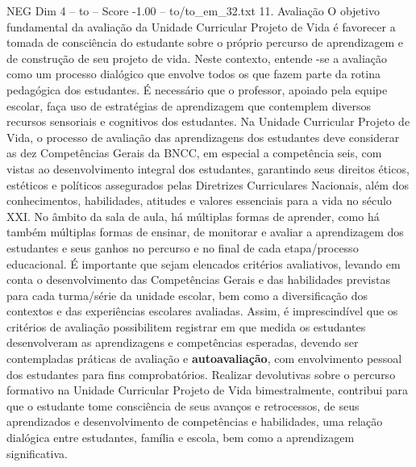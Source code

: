 \begin{textsample}{NEG Dim 4 – to – Score -1.00 – to/to\_em\_32.txt}  \label{ex:f4_neg_090}
11.
Avaliação O objetivo fundamental da avaliação da Unidade Curricular Projeto de Vida é favorecer a tomada de consciência do estudante sobre o próprio percurso de aprendizagem e de construção de seu projeto de vida.
Neste contexto, entende -se a avaliação como um processo dialógico que envolve todos os que fazem parte da rotina pedagógica dos estudantes.
É necessário que o professor, apoiado pela equipe escolar, faça uso de estratégias de aprendizagem que contemplem diversos recursos sensoriais e cognitivos dos estudantes.
Na Unidade Curricular Projeto de Vida, o processo de avaliação das aprendizagens dos estudantes deve considerar as dez Competências Gerais da BNCC, em especial a competência seis, com vistas ao desenvolvimento integral dos estudantes, garantindo seus direitos éticos, estéticos e políticos assegurados pelas Diretrizes Curriculares Nacionais, além dos conhecimentos, habilidades, atitudes e valores essenciais para a vida no século XXI.
No âmbito da sala de aula, há múltiplas formas de aprender, como há também múltiplas formas de ensinar, de monitorar e avaliar a aprendizagem dos estudantes e seus ganhos no percurso e no final de cada etapa/processo educacional.
É importante que sejam elencados critérios avaliativos, levando em conta o desenvolvimento das Competências Gerais e das habilidades previstas para cada turma/série da unidade escolar, bem como a diversificação dos contextos e das experiências escolares avaliadas.
Assim, é imprescindível que os critérios de avaliação possibilitem registrar em que medida os estudantes desenvolveram as aprendizagens e competências esperadas, devendo ser contempladas práticas de avaliação e \textbf{autoavaliação}, com envolvimento pessoal dos estudantes para fins comprobatórios.
Realizar devolutivas sobre o percurso formativo na Unidade Curricular Projeto de Vida bimestralmente, contribui para que o estudante tome consciência de seus avanços e retrocessos, de seus aprendizados e desenvolvimento de competências e habilidades, uma relação dialógica entre estudantes, família e escola, bem como a aprendizagem significativa.

\end{textsample}
